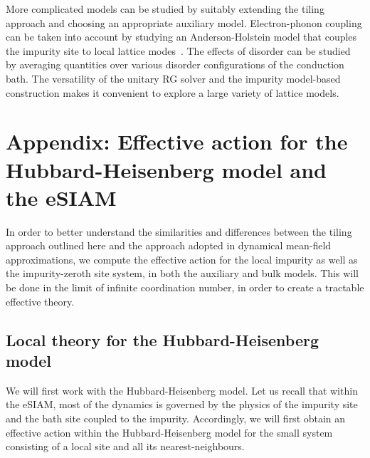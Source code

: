  More complicated models can be studied by suitably extending the tiling approach and choosing an appropriate auxiliary model. Electron-phonon coupling can be taken into account by studying an Anderson-Holstein model that couples the impurity site to local lattice modes~\cite{ACHewson_2002}. The effects of disorder can be studied by averaging quantities over various disorder configurations of the conduction bath. The versatility of the unitary RG solver and the impurity model-based construction makes it convenient to explore a large variety of lattice models.

\section{Appendix: Effective action for the Hubbard-Heisenberg model and the eSIAM}
In order to better understand the similarities and differences between the tiling approach outlined here and the approach adopted in dynamical mean-field approximations, we compute the effective action for the local impurity as well as the impurity-zeroth site system, in both the auxiliary and bulk models. This will be done in the limit of infinite coordination number, in order to create a tractable effective theory.

\subsection{Local theory for the Hubbard-Heisenberg model}
We will first work with the Hubbard-Heisenberg model. Let us recall that within the eSIAM, most of the dynamics is governed by the physics of the impurity site and the bath site coupled to the impurity. Accordingly, we will first obtain an effective action within the Hubbard-Heisenberg model for the small system consisting of a local site and all its nearest-neighbours. 

